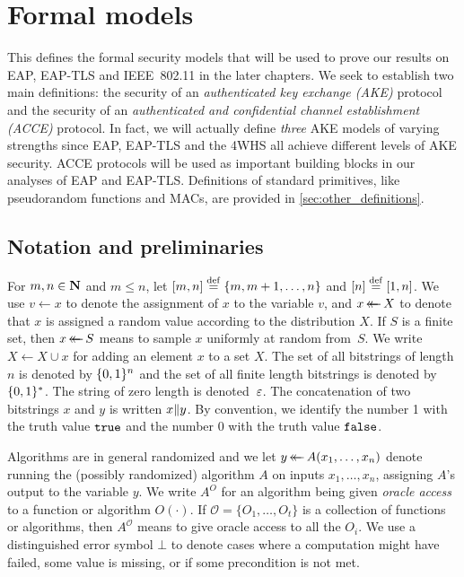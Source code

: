 \chapter{Formal models}\label{sec:definitions}


\begingroup
\hypersetup{linkcolor=black}
\minitoc
\endgroup

\vspace{1ex}


This  defines the formal security models that will be used to prove our results on EAP, EAP-TLS and IEEE~802.11 in the later chapters.
We seek to establish two main definitions:
the security of an \emph{authenticated key exchange (AKE)} protocol and the security of an \emph{authenticated and confidential channel establishment (ACCE)} protocol.
In fact,
we will actually define \emph{three} AKE models of varying strengths
since EAP, EAP-TLS and the 4WHS all achieve different levels of AKE security.
ACCE protocols will be used as important building blocks in our analyses of EAP and EAP-TLS.
Definitions of standard primitives,
like pseudorandom functions and MACs,
are provided in \cref{sec:other_definitions}. 








\section{Notation and preliminaries}
For $m,n \in \mathbf{N}$ and $m \leq n$, 
let $[m,n] \overset{\mathrm{def}}{=} \lbrace m, m+1, \dotsc, n \rbrace$ and $[n] \overset{\mathrm{def}}{=} [1, n]$.
We use $v \gets x$ to denote the assignment of $x$ to the variable $v$,
and  $x \operatorname{\leftarrow\mathrel{\mkern-14mu}\leftarrow} X$ to denote that $x$ is assigned a random value according to the distribution $X$.
If $S$ is a finite set, then $x \operatorname{\leftarrow\mathrel{\mkern-14mu}\leftarrow} S$ means to sample $x$ uniformly at random from~$S$.
We write $X \gets X \cup x$ for adding an element $x$ to a set $X$.
The set of all bitstrings of length $n$ is denoted by $\lbrace 0, 1 \rbrace^n$
and the set of all finite length bitstrings is denoted by $\lbrace 0, 1 \rbrace^*$.
The string of zero length is denoted~$\varepsilon$.
The concatenation of two bitstrings $x$ and $y$ is written $x \| y$.
By convention, we identify the number 1 with the truth value $\mathtt{true}$ and
the number 0 with the truth value $\mathtt{false}$.

Algorithms are in general randomized and we let $y \operatorname{\leftarrow\mathrel{\mkern-14mu}\leftarrow} A(x_1, \dotsc, x_n)$ denote running the (possibly randomized) algorithm $A$ on inputs $x_1, \dotsc, x_n$,
assigning $A$'s output to the variable $y$.
We write $A^O$ for an algorithm being given \emph{oracle access} to a function or algorithm $O(\cdot)$.
If $\mathcal{O} = \lbrace O_1, \dotsc, O_t \rbrace$ is a collection of functions or algorithms,
then $A^{\mathcal{O}}$ means to give oracle access to all the $O_i$.
We use a distinguished error symbol $\bot$ to denote cases where a computation might have failed,
some value is missing, or if some precondition is not met.


